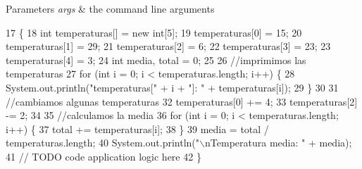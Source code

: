 \begin{DoxyParams}{Parameters}
{\em args} & the command line arguments \\
\hline
\end{DoxyParams}

\begin{DoxyCode}
17                                            \{
18         \textcolor{keywordtype}{int} temperaturas[] = \textcolor{keyword}{new} \textcolor{keywordtype}{int}[5];
19         temperaturas[0] = 15;
20         temperaturas[1] = 29;
21         temperaturas[2] = 6;
22         temperaturas[3] = 23;
23         temperaturas[4] = 3;
24         \textcolor{keywordtype}{int} media, total = 0;
25  
26         \textcolor{comment}{//imprimimos las temperaturas}
27         \textcolor{keywordflow}{for} (\textcolor{keywordtype}{int} i = 0; i < temperaturas.length; i++) \{
28             System.out.println(\textcolor{stringliteral}{"temperaturas["} + i + \textcolor{stringliteral}{"]: "} + temperaturas[i]);
29         \}
30  
31         \textcolor{comment}{//cambiamos algunas temperaturas}
32         temperaturas[0] += 4;
33         temperaturas[2] -= 2;
34  
35         \textcolor{comment}{//calculamos la media}
36         \textcolor{keywordflow}{for} (\textcolor{keywordtype}{int} i = 0; i < temperaturas.length; i++) \{
37             total += temperaturas[i];
38         \}
39         media = total / temperaturas.length;
40         System.out.println(\textcolor{stringliteral}{"\(\backslash\)nTemperatura media: "} + media);
41         \textcolor{comment}{// TODO code application logic here}
42     \}
\end{DoxyCode}
